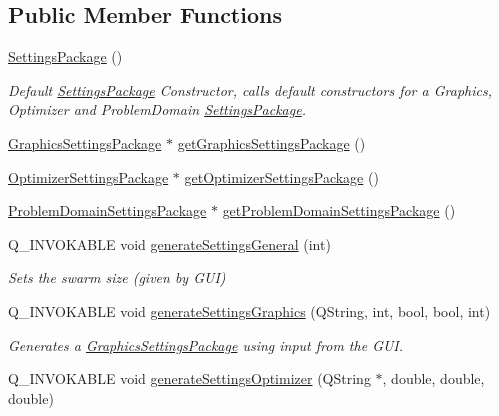 \subsection*{Public Member Functions}
\begin{DoxyCompactItemize}
\item 
\hyperlink{class_settings_package_a387aa321903917fad11b1897f7c4d357}{Settings\+Package} ()\hypertarget{class_settings_package_a387aa321903917fad11b1897f7c4d357}{}\label{class_settings_package_a387aa321903917fad11b1897f7c4d357}

\begin{DoxyCompactList}\small\item\em Default \hyperlink{class_settings_package}{Settings\+Package} Constructor, calls default constructors for a Graphics, Optimizer and Problem\+Domain \hyperlink{class_settings_package}{Settings\+Package}. \end{DoxyCompactList}\item 
\hyperlink{class_graphics_settings_package}{Graphics\+Settings\+Package} $\ast$ \hyperlink{class_settings_package_a7eb1432a2fbda1d204ef73b47b46d1e2}{get\+Graphics\+Settings\+Package} ()
\item 
\hyperlink{class_optimizer_settings_package}{Optimizer\+Settings\+Package} $\ast$ \hyperlink{class_settings_package_a6fa4b42272cf9c8d3847c038bf591914}{get\+Optimizer\+Settings\+Package} ()
\item 
\hyperlink{class_problem_domain_settings_package}{Problem\+Domain\+Settings\+Package} $\ast$ \hyperlink{class_settings_package_a343a97ef7424b400ab17480b77051466}{get\+Problem\+Domain\+Settings\+Package} ()
\item 
Q\+\_\+\+I\+N\+V\+O\+K\+A\+B\+LE void \hyperlink{class_settings_package_aa2c0392e2df98086e2ef64b640e2aab4}{generate\+Settings\+General} (int)
\begin{DoxyCompactList}\small\item\em Sets the swarm size (given by G\+UI) \end{DoxyCompactList}\item 
Q\+\_\+\+I\+N\+V\+O\+K\+A\+B\+LE void \hyperlink{class_settings_package_a1c2aabf66f20e3240c6e35e9e3385081}{generate\+Settings\+Graphics} (Q\+String, int, bool, bool, int)\hypertarget{class_settings_package_a1c2aabf66f20e3240c6e35e9e3385081}{}\label{class_settings_package_a1c2aabf66f20e3240c6e35e9e3385081}

\begin{DoxyCompactList}\small\item\em Generates a \hyperlink{class_graphics_settings_package}{Graphics\+Settings\+Package} using input from the G\+UI. \end{DoxyCompactList}\item 
Q\+\_\+\+I\+N\+V\+O\+K\+A\+B\+LE void \hyperlink{class_settings_package_abab2f666693f6a074e825ef821f5160a}{generate\+Settings\+Optimizer} (Q\+String $\ast$, double, double, double)\hypertarget{class_settings_package_abab2f666693f6a074e825ef821f5160a}{}\label{class_settings_package_abab2f666693f6a074e825ef821f5160a}


\end{DoxyCompactItemize}
